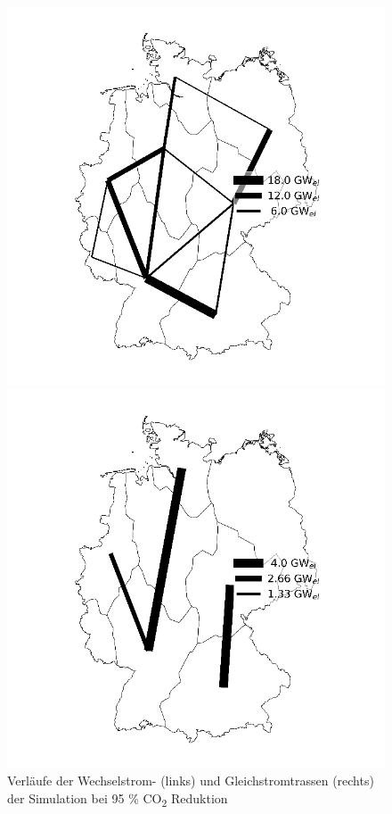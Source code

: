 \begin{figure}[!ht]
  \begin{minipage}[b]{.4\linewidth} 
     \includegraphics{images/AC-95.png}
  \end{minipage}
  \hspace{.1\linewidth}
  \begin{minipage}[b]{.4\linewidth} 
     \includegraphics{images/DC-95.png}
  \end{minipage}
  \caption{Verläufe der Wechselstrom- (links) und Gleichstromtrassen (rechts) der Simulation bei 95 \% CO\textsubscript{2} Reduktion}
  \label{image:Leitungen-95}
\end{figure}
\FloatBarrier
\clearpage 


